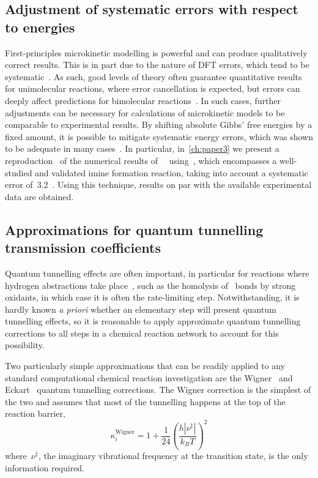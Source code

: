 \subsection{Adjustment of systematic errors with respect to energies}%
\label{sec:rates-error-prop-adj}

First-principles microkinetic modelling is powerful and can produce qualitatively correct results.
This is in part due to the nature of DFT errors,
which tend to be systematic~\cite{P_rez_Soto_2020}.
As such,
good levels of theory often guarantee quantitative results for unimolecular reactions,
where error cancellation is expected,
but errors can deeply affect predictions for bimolecular reactions~\cite{P_rez_Soto_2020}.
In such cases,
further adjustments can be necessary for calculations of microkinetic models to be comparable to experimental results.
By shifting absolute Gibbs' free energies by a fixed amount,
it is possible to mitigate systematic energy errors,
which was shown to be adequate in many cases~\cite{Ahn_2019,P_rez_Soto_2020}.
In particular,
in~\cref{ch:paper3} we present a reproduction~\cite{Schneider_2022} of the numerical results of~\citeauthor{P_rez_Soto_2020}~\cite{P_rez_Soto_2020} using~\overreact{},
which encompasses a well-studied and validated imine formation reaction,
taking into account a systematic error of~3.2~\kcalmol.
Using this technique,
results on par with the available experimental data are obtained.

\subsection{Approximations for quantum tunnelling transmission coefficients}%
\label{sec:tunnelling}

Quantum tunnelling effects are often important,
in particular for reactions where hydrogen abstractions take place~\cite{Bim2018},
such as the homolysis of~ bonds by strong oxidants,
in which case it is often the rate-limiting step.
Notwithstanding,
it is hardly known \emph{a priori} whether an elementary step will present quantum tunnelling effects,
so it is reasonable to apply approximate quantum tunnelling corrections to all steps in a chemical reaction network
to account for this possibility.

Two particularly simple approximations that can be readily applied to any standard computational chemical reaction investigation are the Wigner~\cite{Wigner_1932} and Eckart~\cite{Eckart_1930} quantum tunnelling corrections.
The Wigner correction is the simplest of the two and assumes that most of the tunnelling happens at the top of the reaction barrier,
%
\begin{equation}
	\kappa_i^\text{Wigner}
	= 1 + \frac{1}{24}
	\left(
	\frac{
		h | \nu^\ddagger |
	}{k_B T}
	\right)^2
\end{equation}
%
where~$\nu^\ddagger$,
the imaginary vibrational frequency at the transition state,
is the only information required.

